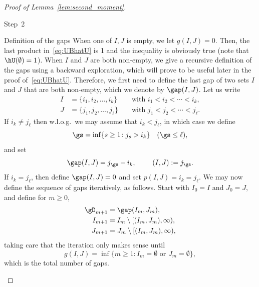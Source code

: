 \begin{proof}[Proof of Lemma~\ref{lem:second_moment}]
\begin{step}{Step~2}
\begin{step}{Definition of the gaps}
When one of $I, J$ is empty, we let $g(I, J)=0$. Then, the last product in~\eqref{eq:UBhatU} is 1 and the inequality is obviously true (note that $\hU(\emptyset) = 1$). When $I$ and $J$ are both non-empty, we give a recursive definition of the gaps using a backward exploration, which will prove to be useful later in the proof of~\eqref{eq:UBhatU}. Therefore, we first need to define the last gap of two sets $I$ and $J$ that are both non-empty, which we denote by $\gap(I,J)$. Let us write
\begin{equation}
\begin{aligned}
I &= \{i_1, i_2, \ldots, i_k\} &&\text{ with } i_1 < i_2 < \cdots < i_k,\\
J &= \{j_1, j_2, \ldots, j_\ell\} &&\text{ with } j_1 < j_2 < \cdots < j_\ell.
\end{aligned}
\end{equation}
If $i_k \neq j_\ell$ then w.l.o.g.~we may assume that $i_k < j_\ell$, in which case we define
\begin{equation}
\gs = \inf\{s \geq 1 \colon j_s > i_k\} \quad (\gs \leq \ell),
\end{equation}
and set
\begin{equation}
\gap(I,J) = j_\gs - i_k, \qquad~(I,J) := j_\gs.
\end{equation}
If $i_k = j_\ell$, then define $\gap(I,J) = 0$ and set $p(I,J) = i_k = j_\ell$. We may now define the sequence of gaps iteratively, as follows. Start with $I_0 = I$ and $J_0 = J$, and define for $m \geq 0$,
\begin{equation}\label{eq:defgaps}
\begin{aligned}
\gD_{m+1} &= \gap(I_m, J_m),\\
I_{m+1} &= I_m \setminus [(I_m,J_m),\infty),\\
J_{m+1} &= J_m \setminus [(I_m,J_m),\infty),
\end{aligned}
\end{equation}
taking care that the iteration only makes sense until
\begin{equation}\label{eq:totalgap}
g(I,J) = \inf\{m \geq 1 \colon I_{m} = \emptyset \text{ or } J_{m} = \emptyset\},
\end{equation}
which is the total number of gaps.
\end{step}


\end{step}
\end{proof}
